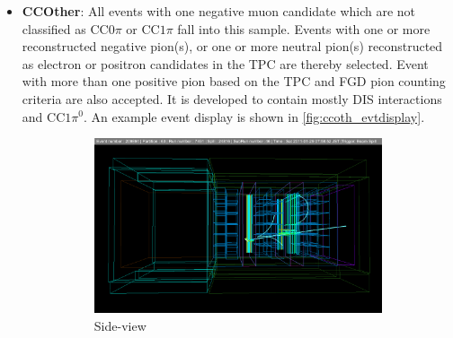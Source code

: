 \begin{itemize}
	\item \textbf{CCOther}: All events with one negative muon candidate which are not classified as CC0$\pi$ or CC$1\pi$ fall into this sample. Events with one or more reconstructed negative pion(s), or one or more neutral pion(s) reconstructed as electron or positron candidates in the TPC are thereby selected. Event with more than one positive pion based on the TPC and FGD pion counting criteria are also accepted. It is developed to contain mostly DIS interactions and CC$1\pi^0$. An example event display is shown in \autoref{fig:ccoth_evtdisplay}.
	\begin{figure}[h]
		\begin{subfigure}[t]{0.49\textwidth}
			\includegraphics[width=\textwidth, trim={20mm 30mm 20mm 30mm}, clip ]{figures/numu/evtdisplay/CCOthers_7491_46_209894_perX0Z_all}
			\caption{Side-view}
		\end{subfigure}
		\begin{subfigure}[t]{0.49\textwidth}

\end{subfigure}
\end{figure}
\end{itemize}
